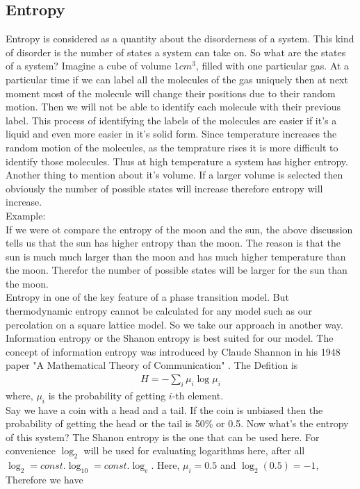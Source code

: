 	\subsection{Entropy}
	Entropy is considered as a quantity about the disorderness of a system. This kind of disorder is the number of states a system can take on. So what are the states of a system? Imagine a cube of volume $1cm^3$, filled with one particular gas. At a particular time if we can label all the molecules of the gas uniquely then at next moment most of the molecule will change their positions due to their random motion. Then we will not be able to identify each molecule with their previous label. This process of identifying the labels of the molecules are easier if it's a liquid and even more easier in it's solid form. Since temperature increases the random motion of the molecules, as the temprature rises it is more difficult to identify those molecules. Thus at high temperature a system has higher entropy. Another thing to mention about it's volume. If a larger volume is selected then obviously the number of possible states will increase therefore entropy will increase.\\
	Example:\\
	If we were ot compare the entropy of the moon and the sun, the above discussion tells us that the sun has higher entropy than the moon. The reason is that the sun is much much larger than the moon and has much higher temperature than the moon. Therefor the number of possible states will be larger for the sun than the moon.\\
	Entropy in one of the key feature of a phase transition model. But thermodynamic entropy cannot be calculated for any model such as our percolation on a square lattice model. So we take our approach in another way. Information entropy or the Shanon entropy is best suited for our model. The concept of information entropy was introduced by Claude Shannon in his 1948 paper "A Mathematical Theory of Communication" \cite{shanon_entropy}. The Defition is
	\begin{align}
		H = - \sum_{i} \mu_i \log \mu_i	
	\end{align}
	where, $\mu_i$ is the probability of getting $i$-th element.\\
	Say we have a coin with a head and a tail. If the coin is unbiased then the probability of getting the head or the tail is 50\% or 0.5. Now what's the entropy of this system? The Shanon entropy is the one that can be used here. For convenience $\log_{2}$ will be used for evaluating logarithms here, after all $\log_{2} = const. \log_{10} = const. \log_{e}$. Here, $\mu_i = 0.5$ and $\log_{2} (0.5) = -1$, Therefore we have
